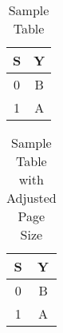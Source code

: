 \documentclass{article}
\begin{document}
\begin{table}[h]
\centering
\caption{Sample Table}
\label{tab:sample}
\begin{adjustbox}{width=0.7\textwidth}
\begin{tabular}{ |c|c| }
  \hline
  S & Y \\
  \hline
  0 & B \\
  \hline
  1 & A \\
  \hline
\end{tabular}
\end{adjustbox}
\end{table}

\begin{table}[h]
\centering
\caption{Sample Table with Adjusted Page Size}
\label{tab:sample2}
\begin{adjustbox}{width=0.7\textwidth}
\begin{tabular}{ |c|c| }
  \hline
  S & Y \\
  \hline
  0 & B \\
  \hline
  1 & A \\
  \hline
\end{tabular}
\end{adjustbox}
\end{table}
\restoregeometry
\end{document}
